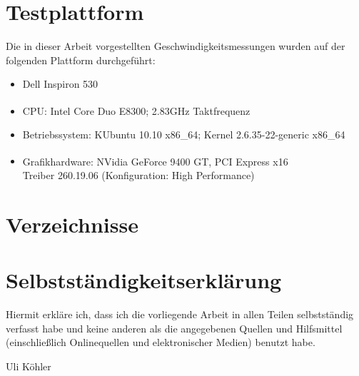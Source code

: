 \documentclass[a4paper,titlepage,12pt]{scrartcl}
\newtheorem[L]{boxedDefinition}{Definition}
\begin{document}
\section{Testplattform}\label{apdx:testplatform}
Die in dieser Arbeit vorgestellten Geschwindigkeitsmessungen wurden auf der folgenden Plattform durchgeführt:
\begin{itemize}
  \item Dell Inspiron 530
  \item CPU: Intel\textsuperscript{\textregistered} Core Duo E8300; 2.83GHz Taktfrequenz
  \item Betriebssystem: KUbuntu 10.10 x86\_64; Kernel 2.6.35-22-generic x86\_64
  \item Grafikhardware: NVidia\textsuperscript{\textregistered} GeForce 9400 GT, PCI Express x16\\
	Treiber 260.19.06 (Konfiguration: High Performance)
\end{itemize}
\newpage
\section{Verzeichnisse}
\listoffigures
\renewcommand\refname{Literatur- und Quellenverzeichnis}


\clearpage
\section{Selbstständigkeitserklärung}
Hiermit erkläre ich, dass ich die vorliegende Arbeit in allen Teilen selbstständig verfasst habe und keine anderen als die angegebenen Quellen und Hilfsmittel (einschließlich Onlinequellen und elektronischer Medien) benutzt habe. 
\vfill
\begin{center}
\underline{\hspace{10cm}}\vspace{1cm}
\end{center}
\begin{center}
Uli Köhler
\end{center}
\vfill
\end{document}
